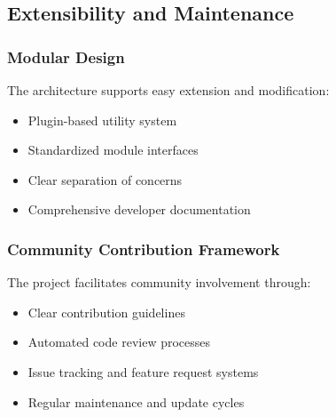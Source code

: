 \subsection{Extensibility and Maintenance}

\subsubsection{Modular Design}

The architecture supports easy extension and modification:

\begin{itemize}
    \item Plugin-based utility system
    \item Standardized module interfaces
    \item Clear separation of concerns
    \item Comprehensive developer documentation
\end{itemize}

\subsubsection{Community Contribution Framework}

The project facilitates community involvement through:

\begin{itemize}
    \item Clear contribution guidelines
    \item Automated code review processes
    \item Issue tracking and feature request systems
    \item Regular maintenance and update cycles
\end{itemize}